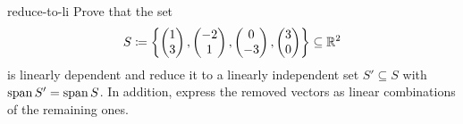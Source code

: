 \begin{problem}{}{reduce-to-li}
 Prove that the set
 \[
  S \coloneqq 
  \left\{ 
   \begin{pmatrix}
    1\\
    3
   \end{pmatrix},
   \begin{pmatrix}
    -2\\
    1
   \end{pmatrix},
   \begin{pmatrix}
    0\\
    -3
   \end{pmatrix},
   \begin{pmatrix}
    3\\
    0
   \end{pmatrix}
  \right\} \subseteq \mathbb{R}^2
 \]
 is linearly dependent and reduce it to a linearly independent set $S' \subseteq
 S$ with $\operatorname{span} S' = \operatorname{span} S$. In addition, express the removed vectors as linear
 combinations of the remaining ones.
\end{problem}

